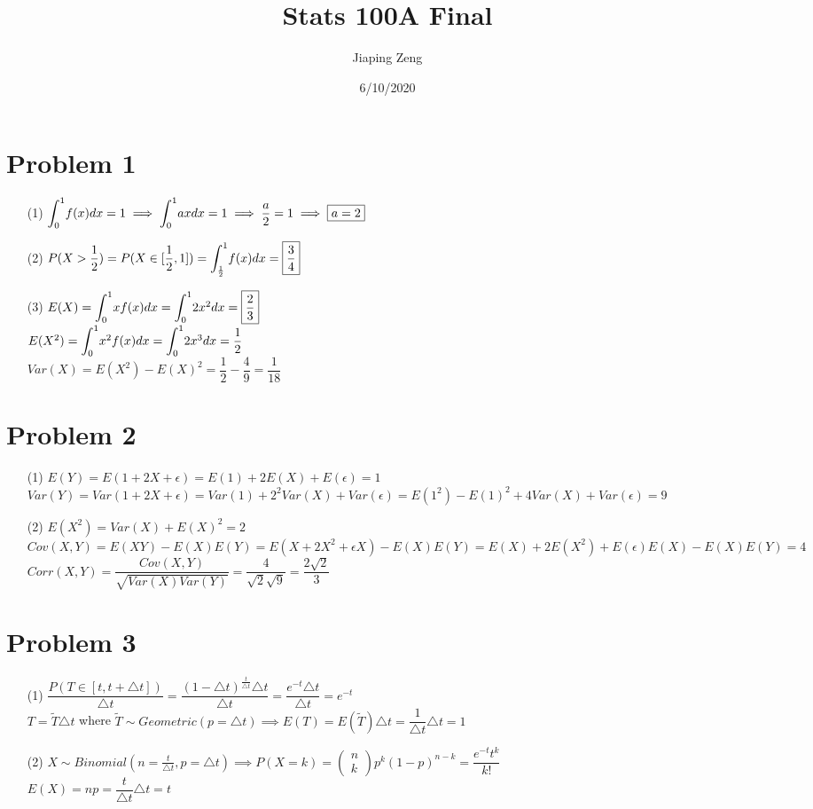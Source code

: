 \documentclass{article}
\title{Stats 100A Final}
\author{Jiaping Zeng}
\date{6/10/2020}
\begin{document}
\maketitle

\section*{Problem 1}
\begin{itemize}
	\item [(1)] $\mathlarger{\int_0^1} f(x)dx=1\implies\mathlarger{\int_0^1} axdx=1\implies\dfrac{a}{2}=1\implies \boxed{a=2}$
	\item [(2)] $P(X>\dfrac{1}{2})=P(X\in[\dfrac{1}{2},1])=\mathlarger{\int_\frac{1}{2}^1} f(x)dx=\boxed{\frac{3}{4}}$
	\item [(3)] $E(X)=\mathlarger{\int_0^1} xf(x)dx=\mathlarger{\int_0^1} 2x^2dx=\boxed{\dfrac{2}{3}}$\\$E(X^2)=\mathlarger{\int_0^1} x^2f(x)dx=\mathlarger{\int_0^1} 2x^3dx=\dfrac{1}{2}$\\$Var(X)=E(X^2)-E(X)^2=\dfrac{1}{2}-\dfrac{4}{9}=\boxed{\dfrac{1}{18}}$
\end{itemize}

\section*{Problem 2}
\begin{itemize}
	\item [(1)] $E(Y)=E(1+2X+\epsilon)=E(1)+2E(X)+E(\epsilon)=\boxed{1}$\\$Var(Y)=Var(1+2X+\epsilon)=Var(1)+2^2Var(X)+Var(\epsilon)=E(1^2)-E(1)^2+4Var(X)+Var(\epsilon)=\boxed{9}$
	\item [(2)] $E(X^2)=Var(X)+E(X)^2=2$\\$Cov(X,Y)=E(XY)-E(X)E(Y)=E(X+2X^2+\epsilon X)-E(X)E(Y)=E(X)+2E(X^2)+E(\epsilon)E(X)-E(X)E(Y)=\boxed{4}$\\$Corr(X,Y)=\dfrac{Cov(X,Y)}{\sqrt{Var(X)Var(Y)}}=\dfrac{4}{\sqrt{2}\sqrt{9}}=\boxed{\dfrac{2\sqrt{2}}{3}}$
\end{itemize}

\section*{Problem 3}
\begin{itemize}
	\item [(1)] $\dfrac{P(T\in[t,t+\triangle t])}{\triangle t}=\dfrac{(1-\triangle t)^\frac{t}{\triangle t}\triangle t}{\triangle t}=\dfrac{e^{-t}\triangle t}{\triangle t}=\boxed{e^{-t}}$\\$T=\widetilde{T}\triangle t$ where $\widetilde{T}\sim Geometric(p=\triangle t)\implies E(T)=E(\widetilde{T})\triangle t=\dfrac{1}{\triangle t}\triangle t=\boxed{1}$
	\item [(2)] $X\sim Binomial(n=\frac{t}{\triangle t},p=\triangle t)\implies P(X=k)=\begin{pmatrix}n\\k\end{pmatrix}p^k(1-p)^{n-k}=\boxed{\dfrac{e^{-t}t^k}{k!}}$\\$E(X)=np=\dfrac{t}{\triangle t}\triangle t=\boxed{t}$
\end{itemize}
\end{document}
